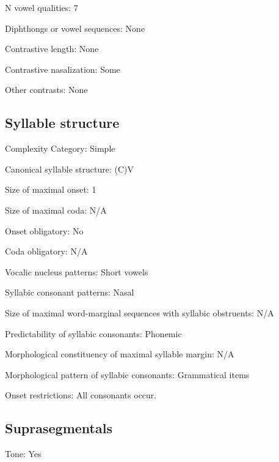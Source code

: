 {\begin{appendixdesc}
\item[N vowel qualities:] 7

\item[Diphthongs or vowel sequences:] None

\item[Contrastive length:] None

\item[Contrastive nasalization:] Some

\item[Other contrasts:] None
\end{appendixdesc}
\subsection*{Syllable structure}
\begin{appendixdesc}

\item[Complexity Category:] Simple

\item[Canonical syllable structure:] (C)V \citep[6]{Bamgbose1966}

\item[Size of maximal onset:] 1

\item[Size of maximal coda:] N/A

\item[Onset obligatory:] No

\item[Coda obligatory:] N/A

\item[Vocalic nucleus patterns:] Short vowels

\item[Syllabic consonant patterns:] Nasal

\item[Size of maximal word-marginal sequences with syllabic obstruents:] N/A

\item[Predictability of syllabic consonants:] Phonemic

\item[Morphological constituency of maximal syllable margin:] N/A

\item[Morphological pattern of syllabic consonants:] Grammatical items

\item[Onset restrictions:] All consonants occur.
\end{appendixdesc}
\subsection*{Suprasegmentals}
\begin{appendixdesc}
\item[Tone:] Yes


\end{appendixdesc}}
